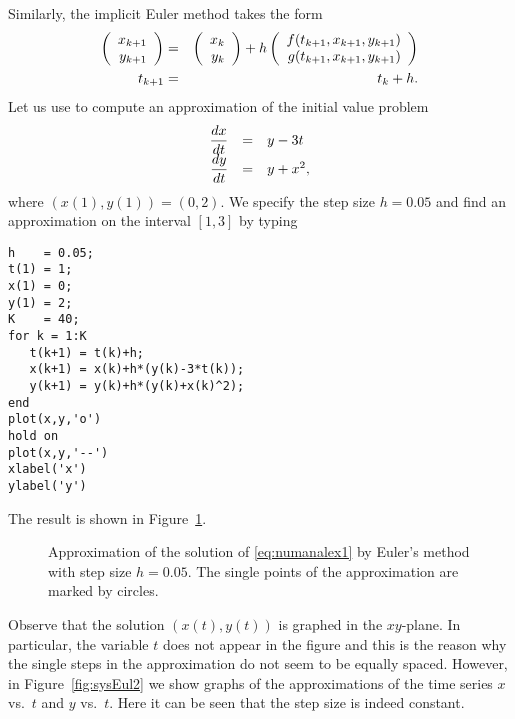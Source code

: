 \documentclass{ximera}
\begin{document}
Similarly, the implicit Euler 
method 
takes the form
\begin{eqnarray*}
\left(\begin{array}{r} x_{k+1} \\ y_{k+1}\end{array}\right) & = &  \left(\begin{array}{r} x_k \\ y_k\end{array}\right) + 
h \left(\begin{array}{r} f(t_{k+1},x_{k+1},y_{k+1}) \\ g(t_{k+1},x_{k+1},y_{k+1})\end{array}\right)\\
t_{k+1} &=& t_k + h.
\end{eqnarray*}
Let us use \Matlab to compute an approximation of the initial
value problem
\arraystart
\begin{equation}
\label{eq:numanalex1}
\begin{array}{rcl}
\displaystyle \frac{dx}{dt} & = & y-3t\\
\displaystyle \frac{dy}{dt} & = & y+x^2,
\end{array}
\end{equation}
\arrayfinish
where $(x(1),y(1))= (0,2)$.  We specify the 
step size $h=0.05$ and find an approximation on the interval 
$[1,3]$ by typing
\begin{verbatim}
h    = 0.05;
t(1) = 1;
x(1) = 0;
y(1) = 2;
K    = 40;
for k = 1:K
   t(k+1) = t(k)+h;
   x(k+1) = x(k)+h*(y(k)-3*t(k));
   y(k+1) = y(k)+h*(y(k)+x(k)^2);
end
plot(x,y,'o')
hold on
plot(x,y,'--')
xlabel('x')
ylabel('y')
\end{verbatim}
The result is shown in Figure~\ref{fig:sysEul1}.
\begin{figure}[htb]
   \centerline{%
   }
   \caption{Approximation of the solution of
   \protect\eqref{eq:numanalex1} by Euler's method
   with step size $h=0.05$.  The single points of
   the approximation are marked by circles.}
   \label{fig:sysEul1}
\end{figure}
Observe that the solution $(x(t),y(t))$ is graphed in
the $xy$-plane.
In particular, the variable $t$ does not appear in the figure 
and this is the reason why the single steps in the approximation
do not seem to be equally spaced.  However, in
Figure~\ref{fig:sysEul2} we show graphs of the approximations
of the time series $x$ vs.\ $t$ and $y$ vs.\ $t$. Here 
it can be seen that the step size is indeed constant.
\begin{figure*}[htb]
   \centerline{%
   }
   \caption{Approximation of the $x$- and $y$-components
   of the solution of \protect\eqref{eq:numanalex1} by Euler's method
   with step size $h=0.05$.}
   \label{fig:sysEul2}
\end{figure*}
\end{document}
